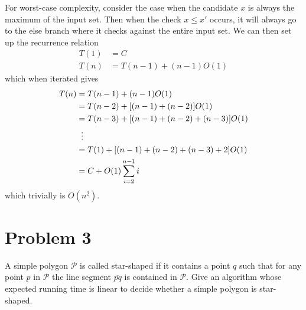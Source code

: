 \documentclass[12pt]{extarticle}
\begin{document}
\begin{solution}
    For worst-case complexity, consider the case when the candidate $x$ is always the maximum of the input set. Then when the check $x \leq x'$ occurs, it will always go to the else branch where it checks against the entire input set. We can then set up the recurrence relation
    \begin{align*}
        T(1) &= C \\
        T(n) &= T(n-1) + (n-1) O(1)
    \end{align*}
    which when iterated gives
    \begin{align*}
        T(n) &= T(n-1) + (n-1) O(1) \\
             &= T(n-2) + \qty[(n-1) + (n-2)] O(1) \\
             &= T(n-3) + \qty[(n-1) + (n-2) + (n-3)] O(1) \\
             &\;\;\vdots \\
             &= T(1) + \qty[(n-1) + (n-2) + (n-3) + 2] O(1) \\
             &= C + O(1) \sum_{i=2}^{n-1} i
    \end{align*}
    which trivially is $O(n^2)$.
\end{solution}

\section*{Problem 3}
A simple polygon $\mathcal{P}$ is called star-shaped if it contains a point $q$ such that for any point $p$ in $\mathcal{P}$ the line segment $\overline{pq}$ is contained in $\mathcal{P}$. Give an algorithm whose expected running time is linear to decide whether a simple polygon is star-shaped.
\end{document}
